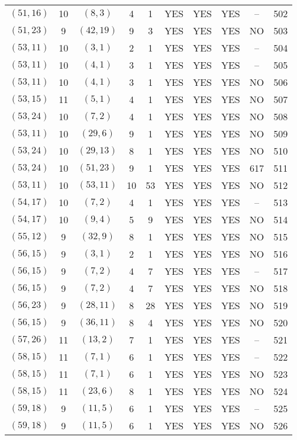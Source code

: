 \begin{longtable}{|c|c|c|c|c|c|c|c|c|c|}
$(51, 16)$ & 10 & $(8, 3)$ & 4 & 1 & YES & YES & YES & -- & 502\\
$(51, 23)$ & 9 & $(42, 19)$ & 9 & 3 & YES & YES & YES & NO & 503\\
$(53, 11)$ & 10 & $(3, 1)$ & 2 & 1 & YES & YES & YES & -- & 504\\
$(53, 11)$ & 10 & $(4, 1)$ & 3 & 1 & YES & YES & YES & -- & 505\\
$(53, 11)$ & 10 & $(4, 1)$ & 3 & 1 & YES & YES & YES & NO & 506\\
$(53, 15)$ & 11 & $(5, 1)$ & 4 & 1 & YES & YES & YES & NO & 507\\
$(53, 24)$ & 10 & $(7, 2)$ & 4 & 1 & YES & YES & YES & NO & 508\\
$(53, 11)$ & 10 & $(29, 6)$ & 9 & 1 & YES & YES & YES & NO & 509\\
$(53, 24)$ & 10 & $(29, 13)$ & 8 & 1 & YES & YES & YES & NO & 510\\
$(53, 24)$ & 10 & $(51, 23)$ & 9 & 1 & YES & YES & YES & 617 & 511\\
$(53, 11)$ & 10 & $(53, 11)$ & 10 & 53 & YES & YES & YES & NO & 512\\
$(54, 17)$ & 10 & $(7, 2)$ & 4 & 1 & YES & YES & YES & -- & 513\\
$(54, 17)$ & 10 & $(9, 4)$ & 5 & 9 & YES & YES & YES & NO & 514\\
$(55, 12)$ & 9 & $(32, 9)$ & 8 & 1 & YES & YES & YES & NO & 515\\
$(56, 15)$ & 9 & $(3, 1)$ & 2 & 1 & YES & YES & YES & NO & 516\\
$(56, 15)$ & 9 & $(7, 2)$ & 4 & 7 & YES & YES & YES & -- & 517\\
$(56, 15)$ & 9 & $(7, 2)$ & 4 & 7 & YES & YES & YES & NO & 518\\
$(56, 23)$ & 9 & $(28, 11)$ & 8 & 28 & YES & YES & YES & NO & 519\\
$(56, 15)$ & 9 & $(36, 11)$ & 8 & 4 & YES & YES & YES & NO & 520\\
$(57, 26)$ & 11 & $(13, 2)$ & 7 & 1 & YES & YES & YES & -- & 521\\
$(58, 15)$ & 11 & $(7, 1)$ & 6 & 1 & YES & YES & YES & -- & 522\\
$(58, 15)$ & 11 & $(7, 1)$ & 6 & 1 & YES & YES & YES & NO & 523\\
$(58, 15)$ & 11 & $(23, 6)$ & 8 & 1 & YES & YES & YES & NO & 524\\
$(59, 18)$ & 9 & $(11, 5)$ & 6 & 1 & YES & YES & YES & -- & 525\\
$(59, 18)$ & 9 & $(11, 5)$ & 6 & 1 & YES & YES & YES & NO & 526\\

\end{longtable}
